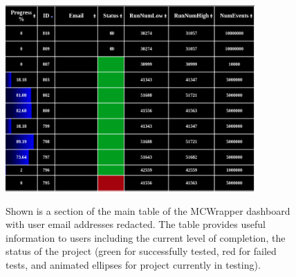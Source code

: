 \begin{figure}[h!]\centering
\includegraphics[width=0.85\textwidth]{figures/mcwrapper_dashboard_redacted.png}
\caption{Shown is a section of the main table of the MCWrapper dashboard with user email addresses redacted. The table provides useful information to users including the current level of completion, the status of the project (green for successfully tested, red for failed tests, and animated ellipses for project currently in testing).  }{\label{fig:MCWrapperDashboard}}
\end{figure}
